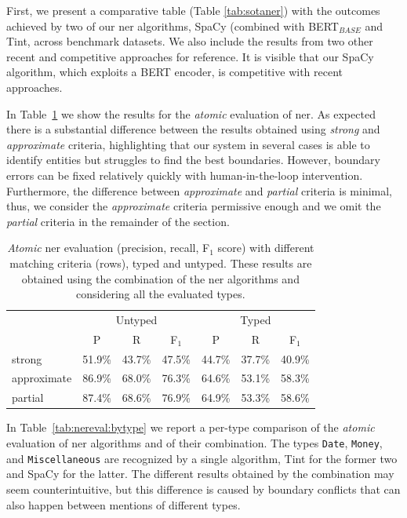 First, we present a comparative table (Table \ref{tab:sotaner}) with the outcomes achieved by two of our \ac{ner} algorithms, SpaCy (combined with BERT$_{BASE}$ and Tint, across benchmark datasets. We also include the results from two other recent and competitive approaches for reference. It is visible that our SpaCy algorithm, which exploits a BERT encoder, is competitive with recent approaches.

In Table~\ref{tab:nereval:bymetric} we show the results for the \textit{atomic} evaluation of \ac{ner}.
As expected there is a substantial difference between the results obtained using \textit{strong} and \textit{approximate} criteria, highlighting that our system in several cases is able to identify entities but struggles to find the best boundaries. However, boundary errors can be fixed relatively quickly with human-in-the-loop intervention. Furthermore, the difference between \textit{approximate} and \textit{partial} criteria is minimal, thus, we consider the \textit{approximate} criteria permissive enough and we omit the \textit{partial} criteria in the remainder of the section.

\begin{table}[H]
    \centering
    \begin{tabular}{l|ccc|ccc}
        & \multicolumn{3}{c|}{Untyped} & \multicolumn{3}{c}{Typed} \\
        & P & R & F$_1$ & P & R & F$_1$ \\
        \hline
        strong              & 51.9\% &	43.7\% &	47.5\% & 44.7\% &	37.7\% &	40.9\%  \\
        approximate         & 86.9\% &	68.0\% &	76.3\% & 64.6\% &	53.1\% &	58.3\% \\
        partial             & 87.4\% &	68.6\% &	76.9\% & 64.9\% &	53.3\% &	58.6\% \\ 
    \end{tabular}
    \caption{\textit{Atomic} \ac{ner} evaluation (precision, recall, F$_1$ score) with different matching criteria (rows), typed and untyped. These results are obtained using the combination of the \ac{ner} algorithms and considering all the evaluated types.}
    \label{tab:nereval:bymetric}
\end{table}

In Table~\ref{tab:nereval:bytype} we report a per-type comparison of the \textit{atomic} evaluation of \ac{ner} algorithms and of their combination. The types \texttt{Date}, \texttt{Money}, and \texttt{Miscellaneous} are recognized by a single algorithm, Tint for the former two and SpaCy for the latter. The different results obtained by the combination may seem counterintuitive, but this difference is caused by boundary conflicts that can also happen between mentions of different types.

